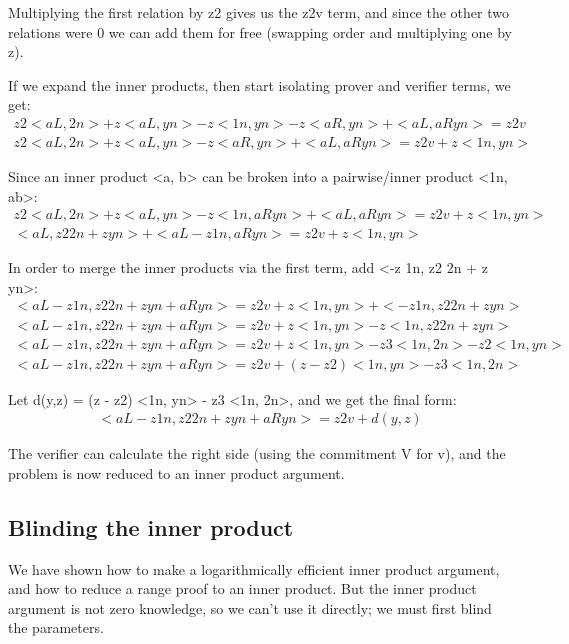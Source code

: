 \documentclass{article}
\begin{document}
Multiplying the first relation by z2 gives us the z2v term, and since the other two relations were 0 we can add them for free (swapping order and multiplying one by z).

If we expand the inner products, then start isolating prover and verifier terms, we get:
\begin{eqnarray}
  z2 <aL, 2n> + z <aL, yn> - z <1n, yn> - z <aR, yn> + <aL,  aRyn> = z2 v\\
  z2 <aL, 2n> + z <aL, yn> - z <aR, yn> + <aL,  aRyn> = z2 v + z <1n, yn>
\end{eqnarray}

Since an inner product <a, b> can be broken into a pairwise/inner product <1n, ab>:
\begin{eqnarray}
  z2 <aL, 2n> + z <aL, yn> - z <1n, aRyn> + <aL,  aRyn> = z2 v + z <1n, yn>\\
  <aL, z2 2n + z yn> + <aL - z 1n, aRyn> = z2 v + z <1n, yn>
\end{eqnarray}

In order to merge the inner products via the first term, add <-z 1n, z2 2n + z yn>:
\begin{eqnarray}
  <aL - z 1n, z2 2n + z yn + aRyn> = z2 v + z <1n, yn> + <-z 1n, z2 2n + z yn>\\
  <aL - z 1n, z2 2n + z yn + aRyn> = z2 v + z <1n, yn> - z <1n, z2 2n + z yn>\\
  <aL - z 1n, z2 2n + z yn + aRyn> = z2 v + z <1n, yn> - z3 <1n, 2n> - z2 <1n, yn>\\
  <aL - z 1n, z2 2n + z yn + aRyn> = z2 v + (z - z2) <1n, yn> - z3 <1n, 2n>
\end{eqnarray}
  
Let d(y,z) = (z - z2) <1n, yn> - z3 <1n, 2n>, and we get the final form:
\begin{eqnarray}
  <aL - z 1n, z2 2n + z yn + aRyn> = z2 v + d(y,z)
\end{eqnarray}

The verifier can calculate the right side (using the commitment V for v), and the problem is now reduced to an inner product argument.


\subsection{Blinding the inner product}

We have shown how to make a logarithmically efficient inner product argument, and how to reduce a range proof to an inner product.  But the inner product argument is not zero knowledge, so we can’t use it directly; we must first blind the parameters.
\end{document}
